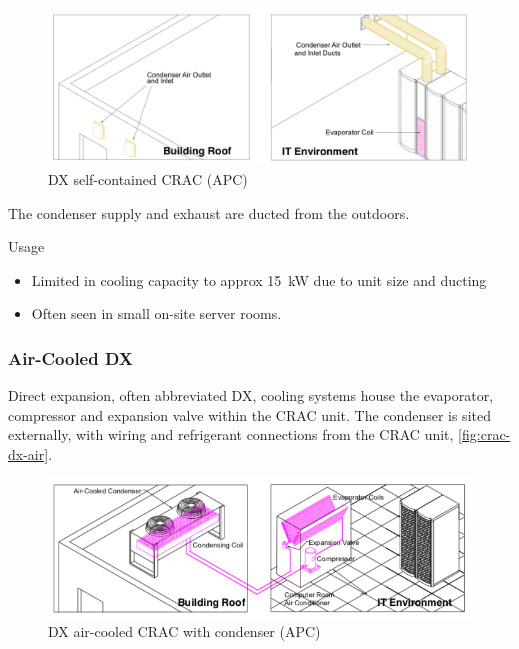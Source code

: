 \documentclass[slides]{pgnotes}
\begin{document}
\begin{figure}[hptb]
  \centering
  \includegraphics[width=1.0\linewidth]{crac_self_contained_schematic}
  \caption{DX self-contained CRAC (APC)}
  \label{fig:crac-dx-self-contained}
\end{figure}

The condenser supply and exhaust are ducted from the outdoors.

\begin{greenbox}{Usage}
  \begin{itemize}
  \item Limited in cooling capacity to approx \SI{15}{\kilo\watt} due to unit size and ducting
  \item Often seen in small on-site server rooms.
  \end{itemize}
\end{greenbox}




\subsubsection{Air-Cooled DX}
\label{sec:air-cooled-dx}

Direct expansion, often abbreviated DX, cooling systems house the evaporator, compressor and expansion valve within the CRAC unit.
The condenser is sited externally, with wiring and refrigerant connections from the CRAC unit, \autoref{fig:crac-dx-air}.

\begin{figure}[hptb]
  \centering
  \includegraphics[width=1.0\linewidth]{crac_dx_air_schematic}
  \caption{DX air-cooled CRAC with condenser (APC)}
  \label{fig:crac-dx-air}
\end{figure}
\end{document}
